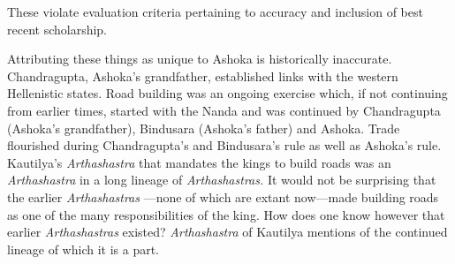 These violate evaluation criteria pertaining to accuracy and inclusion of best recent scholarship. 

Attributing these things as unique to Ashoka is historically inaccurate. Chandragupta, Ashoka's grandfather, established links with the western Hellenistic states. Road building was an ongoing exercise which, if not continuing from earlier times, started with the Nanda and was continued by Chandragupta (Ashoka’s grandfather), Bindusara (Ashoka's father) and Ashoka. Trade flourished during Chandragupta's and Bindusara's rule as well as Ashoka's rule. Kautilya’s \textit{Arthashastra} that mandates the kings to build roads was an \textit{Arthashastra} in a long lineage of \textit{Arthashastras.} It would not be surprising that the earlier \textit{Arthashastras} —none of which are extant now—made building roads as one of the many responsibilities of the king. How does one know however that earlier \textit{Arthashastras} existed? \textit{Arthashastra} of Kautilya mentions of the continued lineage of which it is a part.
